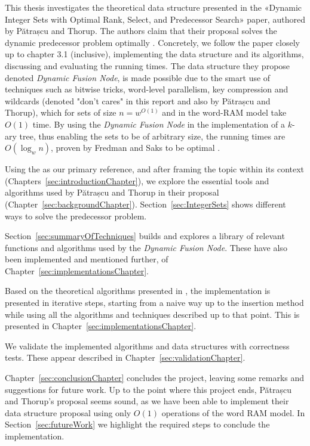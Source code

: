 
This thesis investigates the theoretical data structure presented in the «Dynamic Integer Sets with Optimal Rank, Select, and Predecessor Search» paper, authored by Pătrașcu and Thorup.
The authors claim that their proposal solves the dynamic predecessor problem optimally \cite{patrascu2014dynamic}.
Concretely, we follow the paper closely up to chapter 3.1 (inclusive), implementing the data structure and its algorithms, discussing and evaluating the running times.
The data structure they propose denoted \textit{Dynamic Fusion Node}, is made possible due to the smart use of techniques such as bitwise tricks, word-level parallelism, key compression and wildcards (denoted "don't cares" in this report and also by Pătrașcu and Thorup), which for sets of size $n = w^{O(1)}$ and in the word-RAM model take $O(1)$ time.
By using the \textit{Dynamic Fusion Node} in the implementation of a $k$-ary tree, thus enabling the sets to be of arbitrary size, the running times are $O(\log_w n)$, proven by Fredman and Saks to be optimal \cite{beame1999optimal}.

Using the \cite{patrascu2014dynamic} as our primary reference, and after framing the topic within its context (Chapters~\ref{sec:introductionChapter}), we explore the essential tools and algorithms used by Pătrașcu and Thorup in their proposal (Chapter~\ref{sec:backgroundChapter}).
Section~\ref{sec:IntegerSets} shows different ways to solve the predecessor problem.

Section~\ref{sec:summaryOfTechniques} builds and explores a library of relevant functions and algorithms used by the \textit{Dynamic Fusion Node}. These have also been implemented and mentioned further, of Chapter~\ref{sec:implementationsChapter}.

Based on the theoretical algorithms presented in \cite{patrascu2014dynamic}, the implementation is presented in iterative steps, starting from a naive way up to the insertion method while using all the algorithms and techniques described up to that point. This is presented in Chapter~\ref{sec:implementationsChapter}.

We validate the implemented algorithms and data structures with correctness tests. These appear described in Chapter~\ref{sec:validationChapter}.

Chapter~\ref{sec:conclusionChapter} concludes the project, leaving some remarks and suggestions for future work.
Up to the point where this project ends, Pătrașcu and Thorup's proposal seems sound, as we have been able to implement their data structure proposal using only $O(1)$ operations of the word RAM model. In Section~\ref{sec:futureWork} we highlight the required steps to conclude the implementation.

